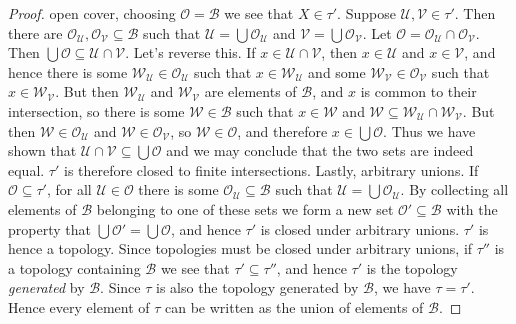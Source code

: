 \documentclass{article}
\theoremstyle{plain}
\theoremstyle{normal}
\begin{document}
\begin{proof}
            open cover, choosing $\mathcal{O}=\mathcal{B}$ we see that
            $X\in\tau'$. Suppose $\mathcal{U},\mathcal{V}\in\tau'$. Then there
            are $\mathcal{O}_{\mathcal{U}},\mathcal{O}_{\mathcal{V}}\subseteq\mathcal{B}$
            such that $\mathcal{U}=\bigcup\mathcal{O}_{\mathcal{U}}$ and
            $\mathcal{V}=\bigcup\mathcal{O}_{\mathcal{V}}$. Let
            $\mathcal{O}=\mathcal{O}_{\mathcal{U}}\cap\mathcal{O}_{\mathcal{V}}$.
            Then $\bigcup\mathcal{O}\subseteq\mathcal{U}\cap\mathcal{V}$. Let's
            reverse this. If $x\in\mathcal{U}\cap\mathcal{V}$, then
            $x\in\mathcal{U}$ and $x\in\mathcal{V}$, and hence there is some
            $\mathcal{W}_{\mathcal{U}}\in\mathcal{O}_{\mathcal{U}}$ such that
            $x\in\mathcal{W}_{\mathcal{U}}$ and some
            $\mathcal{W}_{\mathcal{V}}\in\mathcal{O}_{\mathcal{V}}$ such that
            $x\in\mathcal{W}_{\mathcal{V}}$. But then
            $\mathcal{W}_{\mathcal{U}}$ and $\mathcal{W}_{\mathcal{V}}$ are
            elements of $\mathcal{B}$, and $x$ is common to their intersection,
            so there is some $\mathcal{W}\in\mathcal{B}$ such that
            $x\in\mathcal{W}$ and
            $\mathcal{W}\subseteq\mathcal{W}_{\mathcal{U}}\cap\mathcal{W}_{\mathcal{V}}$.
            But then $\mathcal{W}\in\mathcal{O}_{\mathcal{U}}$ and
            $\mathcal{W}\in\mathcal{O}_{\mathcal{V}}$, so
            $\mathcal{W}\in\mathcal{O}$, and therefore
            $x\in\bigcup\mathcal{O}$. Thus we have shown that
            $\mathcal{U}\cap\mathcal{V}\subseteq\bigcup\mathcal{O}$ and we may
            conclude that the two sets are indeed equal. $\tau'$ is therefore
            closed to finite intersections. Lastly, arbitrary unions. If
            $\mathcal{O}\subseteq\tau'$, for all $\mathcal{U}\in\mathcal{O}$
            there is some $\mathcal{O}_{\mathcal{U}}\subseteq\mathcal{B}$ such
            that $\mathcal{U}=\bigcup\mathcal{O}_{\mathcal{U}}$. By collecting
            all elements of $\mathcal{B}$ belonging to one of these sets
            we form a new set $\mathcal{O}'\subseteq\mathcal{B}$ with the
            property that $\bigcup\mathcal{O}'=\bigcup\mathcal{O}$, and hence
            $\tau'$ is closed under arbitrary unions. $\tau'$ is hence a
            topology. Since topologies must be closed under arbitrary unions,
            if $\tau''$ is a topology containing $\mathcal{B}$ we see that
            $\tau'\subseteq\tau''$, and hence $\tau'$ is the topology
            \textit{generated} by $\mathcal{B}$. Since $\tau$ is also the
            topology generated by $\mathcal{B}$, we have $\tau=\tau'$.
            Hence every element of $\tau$ can be written as the union of
            elements of $\mathcal{B}$.
        \end{proof}
\end{document}
